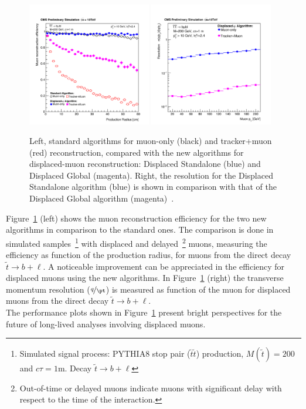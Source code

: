 \begin{figure}[h!]
\centering
  \includegraphics[clip,trim=0cm 0cm 0cm 2cm, width=0.48\textwidth]{Figures/c2/newreco.pdf}
  \includegraphics[clip,trim=0cm 0cm 0cm 2cm, width=0.48\textwidth]{Figures/c2/newreco2.pdf}
  \caption{Left, standard algorithms for muon-only (black) and tracker+muon (red) reconstruction,
compared with the new algorithms for displaced-muon reconstruction: Displaced
Standalone (blue) and Displaced Global
(magenta). Right, the resolution for the Displaced Standalone algorithm (blue) is shown in comparison
with that of the Displaced Global algorithm (magenta)~\cite{CMS-DP-2015-015}.}
  \label{fig:newreco}
\end{figure}

Figure~\ref{fig:newreco} (left) shows the muon reconstruction
efficiency for the two new algorithms in comparison to
the standard ones. The comparison is done in 
simulated samples~\footnote{Simulated signal process: PYTHIA8 stop 
  pair ($\tilde{t}\tilde{t}$) production, $M(\tilde{t}) = 200$\GeV and
$c\tau=1$m. Decay $\tilde{t} \rightarrow b + \ell$} with displaced and
delayed~\footnote{Out-of-time or delayed muons indicate muons with significant delay with respect to the time of the
interaction.} muons, measuring the efficiency as function of the production radius, for muons from
the direct decay $\tilde{t} \rightarrow b + \ell$. A noticeable
improvement can be appreciated in the efficiency for displaced muons
using the new algorithms. In Figure~\ref{fig:newreco} (right) the transverse momentum resolution ($\nicefrac{q}{\pt}$) is
measured as
function of the muon \pt for displaced muons from the direct decay $\tilde{t} \rightarrow b + \ell$.\\
The performance plots shown in Figure~\ref{fig:newreco} present bright
perspectives for the future of long-lived analyses involving
displaced muons. 

